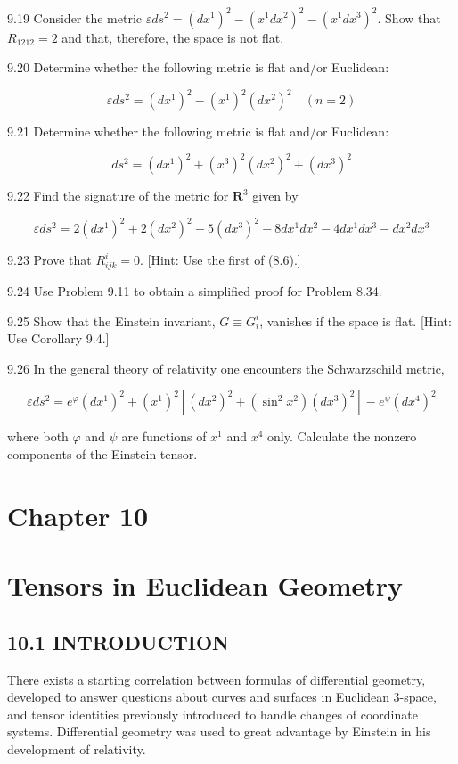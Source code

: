 \documentclass[10pt]{article}
\begin{document}
9.19 Consider the metric $\varepsilon d s^{2}=\left(d x^{1}\right)^{2}-\left(x^{1} d x^{2}\right)^{2}-\left(x^{1} d x^{3}\right)^{2}$. Show that $R_{1212}=2$ and that, therefore, the space is not flat.

9.20 Determine whether the following metric is flat and/or Euclidean:

$$
\varepsilon d s^{2}=\left(d x^{1}\right)^{2}-\left(x^{1}\right)^{2}\left(d x^{2}\right)^{2} \quad(n=2)
$$

9.21 Determine whether the following metric is flat and/or Euclidean:

$$
d s^{2}=\left(d x^{1}\right)^{2}+\left(x^{3}\right)^{2}\left(d x^{2}\right)^{2}+\left(d x^{3}\right)^{2}
$$

9.22 Find the signature of the metric for $\mathbf{R}^{3}$ given by

$$
\varepsilon d s^{2}=2\left(d x^{1}\right)^{2}+2\left(d x^{2}\right)^{2}+5\left(d x^{3}\right)^{2}-8 d x^{1} d x^{2}-4 d x^{1} d x^{3}-d x^{2} d x^{3}
$$

9.23 Prove that $R_{i j k}^{i}=0$. [Hint: Use the first of (8.6).]

9.24 Use Problem 9.11 to obtain a simplified proof for Problem 8.34.

9.25 Show that the Einstein invariant, $G \equiv G_{i}^{i}$, vanishes if the space is flat. [Hint: Use Corollary 9.4.]

9.26 In the general theory of relativity one encounters the Schwarzschild metric,

$$
\varepsilon d s^{2}=e^{\varphi}\left(d x^{1}\right)^{2}+\left(x^{1}\right)^{2}\left[\left(d x^{2}\right)^{2}+\left(\sin ^{2} x^{2}\right)\left(d x^{3}\right)^{2}\right]-e^{\psi}\left(d x^{4}\right)^{2}
$$

where both $\varphi$ and $\psi$ are functions of $x^{1}$ and $x^{4}$ only. Calculate the nonzero components of the Einstein tensor.

\section*{Chapter 10}
\section*{Tensors in Euclidean Geometry}
\subsection*{10.1 INTRODUCTION}
There exists a starting correlation between formulas of differential geometry, developed to answer questions about curves and surfaces in Euclidean 3-space, and tensor identities previously introduced to handle changes of coordinate systems. Differential geometry was used to great advantage by Einstein in his development of relativity.
\end{document}
